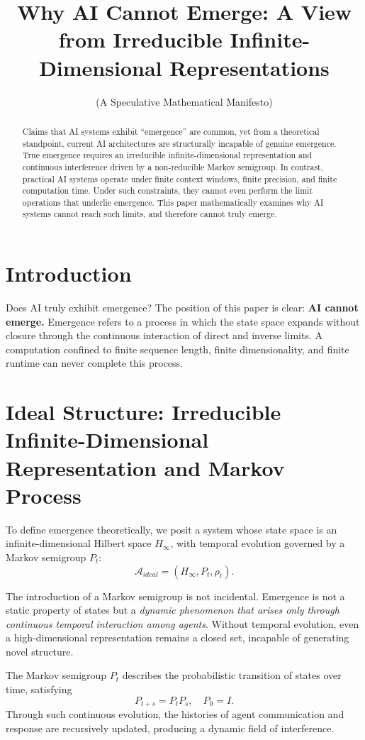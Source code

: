 \documentclass[12pt]{article}
\title{\textbf{Why AI Cannot Emerge: A View from Irreducible Infinite-Dimensional Representations}}
\author{(A Speculative Mathematical Manifesto)}
\date{}
\begin{document}
\maketitle

\begin{abstract}
Claims that AI systems exhibit ``emergence'' are common, yet from a theoretical standpoint,
current AI architectures are structurally incapable of genuine emergence.
True emergence requires an irreducible infinite-dimensional representation and
continuous interference driven by a non-reducible Markov semigroup.
In contrast, practical AI systems operate under finite context windows, finite precision, and finite computation time.
Under such constraints, they cannot even perform the limit operations that underlie emergence.
This paper mathematically examines why AI systems cannot reach such limits,
and therefore cannot truly emerge.
\end{abstract}

\section{Introduction}
Does AI truly exhibit emergence?  
The position of this paper is clear:  
\textbf{AI cannot emerge.}  
Emergence refers to a process in which the state space expands without closure
through the continuous interaction of direct and inverse limits.
A computation confined to finite sequence length, finite dimensionality, and finite runtime
can never complete this process.

\section{Ideal Structure: Irreducible Infinite-Dimensional Representation and Markov Process}
To define emergence theoretically, we posit a system whose state space
is an infinite-dimensional Hilbert space $H_\infty$,
with temporal evolution governed by a Markov semigroup $P_t$:
\[
\mathcal{A}_{ideal} = (H_\infty, P_t, \rho_t).
\]

The introduction of a Markov semigroup is not incidental.
Emergence is not a static property of states but a
\textit{dynamic phenomenon that arises only through continuous temporal interaction among agents}.
Without temporal evolution, even a high-dimensional representation remains a closed set,
incapable of generating novel structure.

The Markov semigroup $P_t$ describes the probabilistic transition of states over time,
satisfying
\[
P_{t+s} = P_t P_s, \quad P_0 = I.
\]
Through such continuous evolution, the histories of agent communication and response
are recursively updated, producing a dynamic field of interference.
\end{document}
